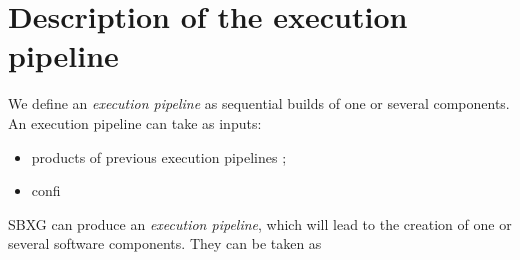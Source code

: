 \documentclass{article}
\begin{document}
\begin{center}
\end{center}


\section{Description of the execution pipeline}

We define an \emph{execution pipeline} as sequential builds of one or several components.
An execution pipeline can take as inputs:
\begin{itemize}
\item products of previous execution pipelines ;
  \item confi
\end{itemize}

SBXG can produce an \emph{execution pipeline}, which will lead to the creation
of one or several software components. They can be taken as
\end{document}
